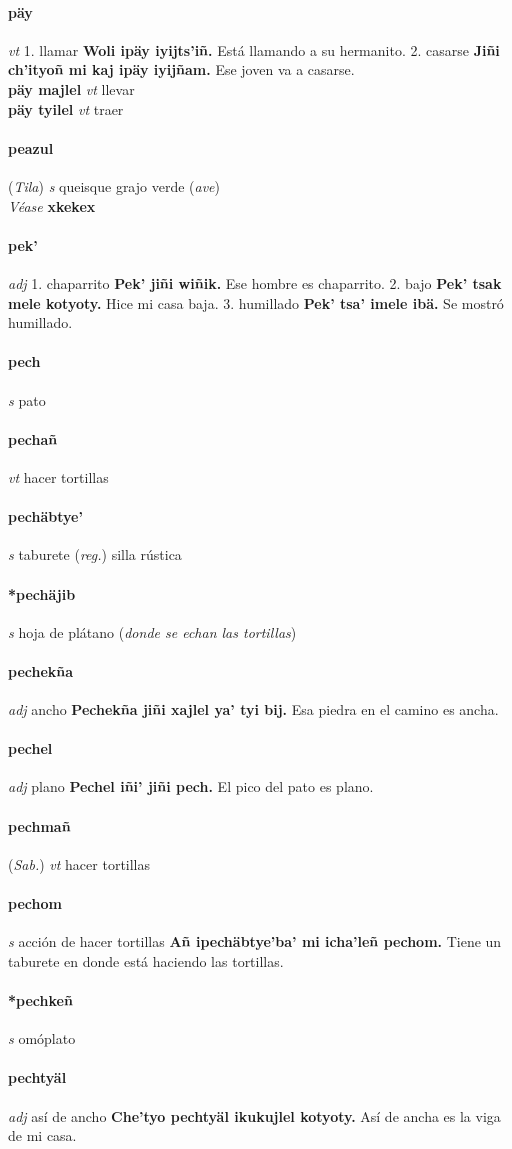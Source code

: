 \documentclass{scrbook}
\newcommand{\entry}[1]{\paragraph{#1}}
\newcommand{\onedefinition}[1]{#1.}
\newcommand{\partofspeech}[1]{\textit{#1}}
\newcommand{\spanishtranslation}[1]{#1}
\newcommand{\clarification}[1]{(\textit{#1})}
\newcommand{\cholexample}[1]{\textbf{#1}}
\newcommand{\exampletranslation}[1]{#1}
\newcommand{\alsosee}[1]{\\\textit{Véase} \textbf{#1}}
\newcommand{\relevantdialect}[1]{(\textit{#1})}
\newcommand{\secondaryentry}[1]{\\\textbf{#1}}
\newcommand{\secondpartofspeech}[1]{\textit{#1}}
\newcommand{\secondtranslation}[1]{#1}
\begin{document}
\begin{multicols}{2}
\entry{päy}
\partofspeech{vt}
\onedefinition{1}
\spanishtranslation{llamar}
\cholexample{Woli ipäy iyijts'iñ.}
\exampletranslation{Está llamando a su hermanito.}
\onedefinition{2}
\spanishtranslation{casarse}
\cholexample{Jiñi ch'ityoñ mi kaj ipäy iyijñam.}
\exampletranslation{Ese joven va a casarse.}
\secondaryentry{päy majlel}
\secondpartofspeech{vt}
\secondtranslation{llevar}
\secondaryentry{päy tyilel}
\secondpartofspeech{vt}
\secondtranslation{traer}

\entry{peazul}
\relevantdialect{Tila}
\partofspeech{s}
\spanishtranslation{queisque}
\spanishtranslation{grajo verde}
\clarification{ave}
\alsosee{xkekex}

\entry{pek'}
\partofspeech{adj}
\onedefinition{1}
\spanishtranslation{chaparrito}
\cholexample{Pek' jiñi wiñik.}
\exampletranslation{Ese hombre es chaparrito.}
\onedefinition{2}
\spanishtranslation{bajo}
\cholexample{Pek' tsak mele kotyoty.}
\exampletranslation{Hice mi casa baja.}
\onedefinition{3}
\spanishtranslation{humillado}
\cholexample{Pek' tsa' imele ibä.}
\exampletranslation{Se mostró humillado.}

\entry{pech}
\partofspeech{s}
\spanishtranslation{pato}

\entry{pechañ}
\partofspeech{vt}
\spanishtranslation{hacer tortillas}

\entry{pechäbtye'}
\partofspeech{s}
\spanishtranslation{taburete}
\clarification{reg.}
\spanishtranslation{silla rústica}

\entry{*pechäjib}
\partofspeech{s}
\spanishtranslation{hoja de plátano}
\clarification{donde se echan las tortillas}

\entry{pechekña}
\partofspeech{adj}
\spanishtranslation{ancho}
\cholexample{Pechekña jiñi xajlel ya' tyi bij.}
\exampletranslation{Esa piedra en el camino es ancha.}

\entry{pechel}
\partofspeech{adj}
\spanishtranslation{plano}
\cholexample{Pechel iñi' jiñi pech.}
\exampletranslation{El pico del pato es plano.}

\entry{pechmañ}
\relevantdialect{Sab.}
\partofspeech{vt}
\spanishtranslation{hacer tortillas}

\entry{pechom}
\partofspeech{s}
\spanishtranslation{acción de hacer tortillas}
\cholexample{Añ ipechäbtye'ba' mi icha'leñ pechom.}
\exampletranslation{Tiene un taburete en donde está haciendo las tortillas.}

\entry{*pechkeñ}
\partofspeech{s}
\spanishtranslation{omóplato}

\entry{pechtyäl}
\partofspeech{adj}
\spanishtranslation{así de ancho}
\cholexample{Che'tyo pechtyäl ikukujlel kotyoty.}
\exampletranslation{Así de ancha es la viga de mi casa.}


\end{multicols}
\end{document}
